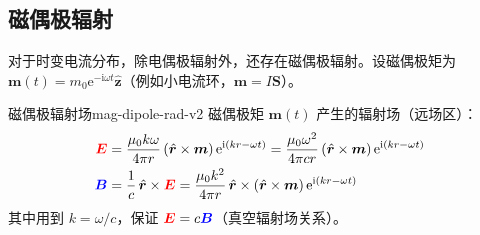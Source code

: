 \documentclass[11pt,a4paper,openany,oneside]{book}
\newcommand{\vecE}{\textcolor{red}{\vect{E}}}
\newcommand{\vecB}{\textcolor{blue}{\vect{B}}}
\newcommand{\ii}{\mathrm{i}}
\newcommand{\ee}{\mathrm{e}}
\newcommand{\muz}{\mu_0}
\newcommand{\vect}[1]{\bm{#1}}
\newcommand{\unitvec}[1]{\hat{\vect{#1}}}
\begin{document}
\subsection{磁偶极辐射}

对于时变电流分布，除电偶极辐射外，还存在磁偶极辐射。设磁偶极矩为 $\vect{m}(t) = m_0 \ee^{-\ii\omega t} \unitvec{z}$（例如小电流环，$\vect{m} = I\vect{S}$）。

\begin{theorem}{磁偶极辐射场}{mag-dipole-rad-v2}
磁偶极矩 $\vect{m}(t)$ 产生的辐射场（远场区）：
\begin{align}
\vecE &= \frac{\muz k\omega}{4\pi r} \, (\unitvec{r} \times \vect{m}) \, \ee^{\ii(kr - \omega t)} = \frac{\muz\omega^2}{4\pi c r} \, (\unitvec{r} \times \vect{m}) \, \ee^{\ii(kr - \omega t)} \\
\vecB &= \frac{1}{c}\,\unitvec{r} \times \vecE = \frac{\muz k^2}{4\pi r} \, \unitvec{r} \times (\unitvec{r} \times \vect{m}) \, \ee^{\ii(kr - \omega t)}
\end{align}
其中用到 $k = \omega/c$，保证 $\vecE = c\vecB$（真空辐射场关系）。
\end{theorem}
\end{document}
